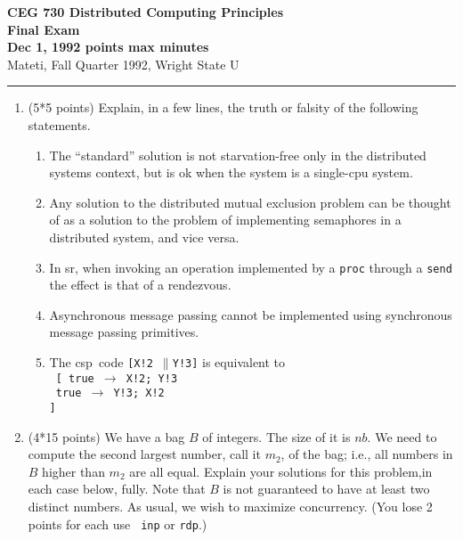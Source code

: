 \def\fat{\framebox[1mm]{\rule{0mm}{2mm}}}
\def\pr{$\parallel$}
\def\rar{$\rightarrow$}
\def\CSP{{\sc csp}}
\def\RPC{{\sc rpc}}
\def\SR{{\sc sr}}

\parindent=0pt



{\bf CEG 
\large \bf 730 Distributed Computing Principles\\[5pt]
\large Final Exam\\[10pt]
Dec 1, 1992 points max  minutes\\
}
\bigskip
{Mateti,  Fall Quarter 1992, Wright State U}\\[-5pt]
\hrule

\begin{enumerate}

\item (5*5 points)
Explain, in a few lines, the truth or falsity of the following
statements.

\begin{enumerate}
\item 
The ``standard'' solution  \noindent is not
starvation-free only in the distributed systems context, but is
ok when the system is a single-cpu system.

\item
Any solution to the distributed mutual exclusion problem can be
thought of as a solution to the problem of implementing semaphores in
a distributed system, and vice versa.

\item
In \SR, when invoking an operation implemented by a {\tt proc} through
a {\tt send} the effect is that of a rendezvous.

\item
Asynchronous message passing cannot be implemented using synchronous
message passing primitives.

\item
The \CSP\ code {\tt [X!2 \pr Y!3]} is equivalent to \\
{\tt
[  true \rar\ X!2; Y!3\\
\fat\ true \rar\ Y!3; X!2\\
]}

\end{enumerate}

\item (4*15 points)
We have a bag $B$ of integers.  The size of it is $nb$.  We need to
compute the second largest number, call it $m_2$, of the bag; i.e.,
all numbers in $B$ higher than $m_2$ are all equal.  Explain your
solutions for this problem,in each case below, fully.  Note that $B$
is not guaranteed to have at least two distinct numbers.  As usual, we
wish to maximize concurrency.  (You lose 2 points for each use {\tt
inp} or {\tt rdp}.)


\end{enumerate}
